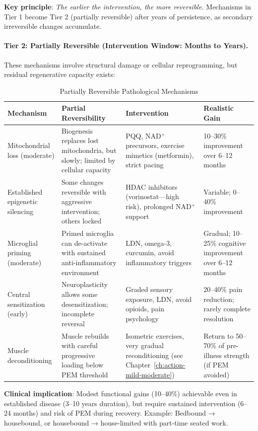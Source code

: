 \textbf{Key principle}: \textit{The earlier the intervention, the more reversible.} Mechanisms in Tier 1 become Tier 2 (partially reversible) after years of persistence, as secondary irreversible changes accumulate.

\paragraph{Tier 2: Partially Reversible (Intervention Window: Months to Years).}

These mechanisms involve structural damage or cellular reprogramming, but residual regenerative capacity exists:

\begin{table}[htbp]
\centering
\caption{Partially Reversible Pathological Mechanisms}
\label{tab:reversible-tier2}
\small
\begin{tabular}{@{}p{3.5cm}p{4cm}p{4cm}p{2cm}@{}}
\toprule
\textbf{Mechanism} & \textbf{Partial Reversibility} & \textbf{Intervention} & \textbf{Realistic Gain} \\
\midrule
Mitochondrial loss (moderate) & Biogenesis replaces lost mitochondria, but slowly; limited by cellular capacity & PQQ, NAD$^+$ precursors, exercise mimetics (metformin), strict pacing & 10--30\% improvement over 6--12 months \\
\addlinespace
Established epigenetic silencing & Some changes reversible with aggressive intervention; others locked & HDAC inhibitors (vorinostat—high risk), prolonged NAD$^+$ support & Variable; 0--40\% improvement \\
\addlinespace
Microglial priming (moderate) & Primed microglia can de-activate with sustained anti-inflammatory environment & LDN, omega-3, curcumin, avoid inflammatory triggers & Gradual; 10--25\% cognitive improvement over 6--12 months \\
\addlinespace
Central sensitization (early) & Neuroplasticity allows some desensitization; incomplete reversal & Graded sensory exposure, LDN, avoid opioids, pain psychology & 20--40\% pain reduction; rarely complete resolution \\
\addlinespace
Muscle deconditioning & Muscle rebuilds with careful progressive loading below PEM threshold & Isometric exercises, very gradual reconditioning (see Chapter~\ref{ch:action-mild-moderate}) & Return to 50--70\% of pre-illness strength (if PEM avoided) \\
\bottomrule
\end{tabular}
\par\smallskip
\footnotesize{\textbf{Clinical implication}: Modest functional gains (10--40\%) achievable even in established disease (3--10 years duration), but require sustained intervention (6--24 months) and risk of PEM during recovery. Example: Bedbound → housebound, or housebound → house-limited with part-time seated work.}
\end{table}

